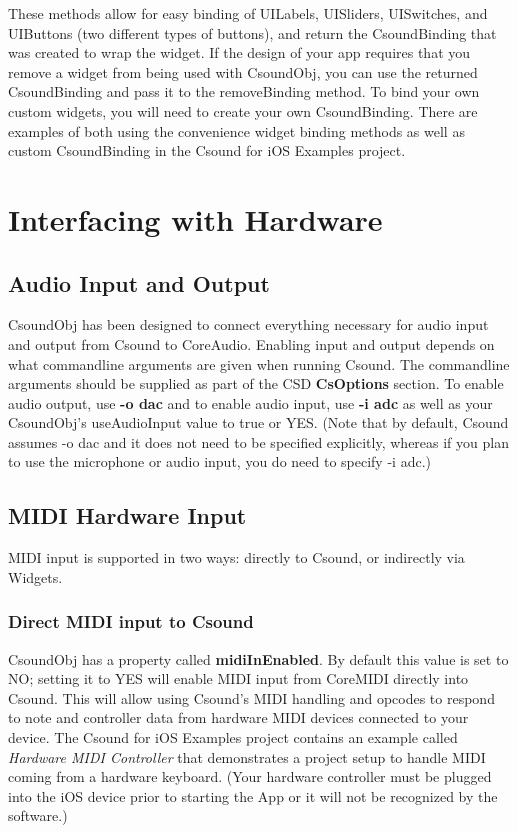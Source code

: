 \documentclass[11pt]{article}
\begin{document}
These methods allow for easy binding of UILabels, UISliders, UISwitches, and UIButtons (two different types of buttons), and return the CsoundBinding that was created to wrap the widget. If the design of your app requires that you remove a widget from being used with CsoundObj, you can use the returned CsoundBinding and pass it to the removeBinding method. To bind your own custom widgets, you will need to create your own CsoundBinding.  There are examples of both using the convenience widget binding methods as well as custom CsoundBinding in the Csound for iOS Examples project.


\section{Interfacing with Hardware}
\subsection{Audio Input and Output}

CsoundObj has been designed to connect everything necessary for audio input and output from Csound to CoreAudio.  Enabling input and output depends on what commandline arguments are given when running Csound.  The commandline arguments should be supplied as part of the CSD \textbf{CsOptions} section.  To enable audio output, use \textbf{-o dac} and to enable audio input, use \textbf{-i adc} as well as your CsoundObj's useAudioInput value to true or YES. (Note that by default, Csound assumes -o dac and it does not need to be specified explicitly, whereas if you plan to use the microphone or audio input, you do need to specify -i adc.)


\subsection{MIDI Hardware Input}

MIDI input is supported in two ways: directly to Csound, or indirectly via Widgets.

\subsubsection{Direct MIDI input to Csound}

CsoundObj has a property called \textbf{midiInEnabled}.  By default this value is set to NO; setting it to YES will enable MIDI input from CoreMIDI directly into Csound. This will allow using Csound's MIDI handling and opcodes to respond to note and controller data from hardware MIDI devices connected to your device.  The Csound for iOS Examples project contains an example called \emph{Hardware MIDI Controller} that demonstrates a project setup to handle MIDI coming from a hardware keyboard.  (Your hardware controller must be plugged into the iOS device prior to starting the App or it will not be recognized by the software.)
\end{document}
